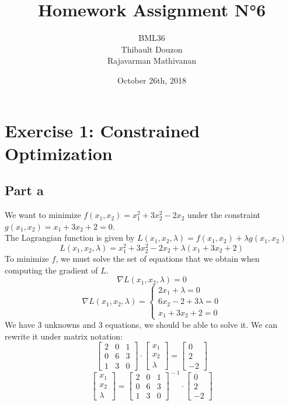 \documentclass[a4paper, 10pt]{article}
\title{Homework Assignment N°6}
\author{BML36\\Thibault Douzon\\Rajavarman Mathivanan}
\date{October 26th, 2018}
\begin{document}
\maketitle

\pagebreak

\tableofcontents

\pagebreak
\section{Exercise 1: Constrained Optimization}
\subsection{Part a}
We want to minimize $f(x_1,x_2)= x_1^2+3x_2^2-2x_2$ under the constraint $g(x_1,x_2)=x_1+3x_2+2=0$.
\\
The Lagrangian function is given by $L(x_1,x_2,\lambda) = f(x_1,x_2)+\lambda g(x_1,x_2)$
$$
L(x_1,x_2,\lambda) = x_1^2+3x_2^2-2x_2 + \lambda (x_1+3x_2+2)
$$
To minimize $f$, we must solve the set of equations that we obtain when computing the gradient of $L$.
$$
\nabla L(x_1,x_2,\lambda) = 0
$$
$$
\nabla L(x_1,x_2,\lambda) = \left\{ \begin{array}{c}
    2x_1+\lambda = 0\\
    6x_2-2+3\lambda = 0\\
    x_1+3x_2+2=0
\end{array}\right. 
$$
We have 3 unknowns and 3 equations, we should be able to solve it. We can rewrite it under matrix notation:
$$
\begin{bmatrix}
    2 & 0 & 1\\
    0 & 6 & 3\\
    1 & 3 & 0
\end{bmatrix} \cdot \begin{bmatrix}
    x_1\\
    x_2\\
    \lambda
\end{bmatrix} = \begin{bmatrix}
    0\\
    2\\
    -2
\end{bmatrix}
$$
$$
\begin{bmatrix}
    x_1\\
    x_2\\
    \lambda
\end{bmatrix} =\begin{bmatrix}
    2 & 0 & 1\\
    0 & 6 & 3\\
    1 & 3 & 0
\end{bmatrix}^{\!-1} \cdot \begin{bmatrix}
    0\\
    2\\
    -2
\end{bmatrix}
$$
\end{document}
